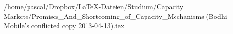 /home/pascal/Dropbox/LaTeX-Dateien/Studium/Capacity Markets/Promises_And_Shortcoming_of_Capacity_Mechanisms (Bodhi-Mobile's conflicted copy 2013-04-13).tex